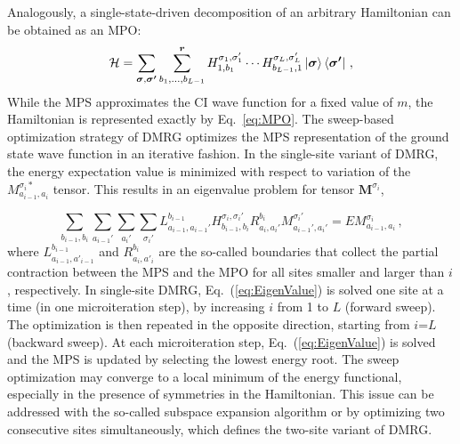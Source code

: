 \documentclass[journal=jctcce]{achemso}
\newcommand{\opr}[1]{\mathcal{#1}}
\newcommand{\vct}[1]{\bm{#1}}
\begin{document}
\noindent Analogously, a single-state-driven decomposition of an arbitrary Hamiltonian can be obtained as an MPO:\cite{Schollwoeck2011_Review-DMRG, McCulloch2007_FromMPStoDMRG}
\begin{equation}
  \opr{H} = \sum_{\vct{\sigma},\vct{\sigma'} } \sum_{b_1, \dots, b_{L-1}}^{\vct{r}} 
            H_{1, b_1}^{\sigma_1, \sigma'_1} \cdots H_{b_{L-1},1}^{\sigma_L,\sigma'_L}
            \ket{\vct{\sigma}}\bra{\vct{\sigma'}} \, ,
  \label{eq:MPO}
\end{equation}
%
While the MPS approximates the CI wave function for a fixed value of $m$, the Hamiltonian is represented exactly by Eq.~\eqref{eq:MPO}.
The sweep-based optimization strategy of DMRG optimizes the MPS representation of the ground state wave function in an iterative fashion.
In the single-site variant of DMRG, the energy expectation value is minimized with respect to variation of the $M_{a_{i-1}, a_i}^{\sigma_i*}$ tensor.
This results in an eigenvalue problem for tensor $\bm{M}^{\sigma_i}$,

\begin{equation}
  \sum_{b_{i-1},b_i}\sum_{a_{i-1}'} \sum_{a_i'} \sum_{\sigma_i'}
    L_{a_{i-1},a_{i-1}'}^{b_{i-1}} H_{b_{i-1},b_i}^{\sigma_i,\sigma_i'} R_{a_i,a_i'}^{b_i} M_{a_{i-1}',a_i'}^{\sigma_i'} 
  = E M_{a_{i-1},a_i}^{\sigma_i} \, ,
  \label{eq:EigenValue}
\end{equation}
%
where $L_{a_{i-1},a'_{i-1}}^{b_{i-1}}$ and $R_{a_i, a'_i}^{b_i}$ are the so-called boundaries\cite{Schollwoeck2011_Review-DMRG,Keller2015_MPS-MPO-SQHamiltonian} that collect the partial contraction between the MPS and the MPO for all sites smaller and larger than $i$, respectively.
In single-site DMRG, Eq.~(\ref{eq:EigenValue}) is solved one site at a time (in one microiteration step), by increasing $i$ from 1 to $L$ (forward sweep).
The optimization is then repeated in the opposite direction, starting from $i$=$L$ (backward sweep).
At each microiteration step, Eq.~(\ref{eq:EigenValue}) is solved and the MPS is updated by selecting the lowest energy root. 
The sweep optimization may converge to a local minimum of the energy functional, especially in the presence of symmetries in the Hamiltonian.
This issue can be addressed with the so-called subspace expansion algorithm\cite{McCulloch2015_Mixing} or by optimizing two consecutive sites simultaneously, which defines the two-site variant of DMRG.\cite{Keller2015_MPS-MPO-SQHamiltonian}
\end{document}
